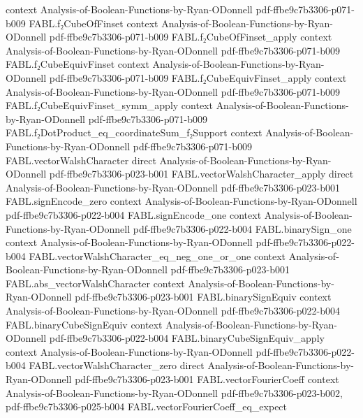 \begin{theorem}
  {context}
  {Analysis-of-Boolean-Functions-by-Ryan-ODonnell}
  {pdf-ffbe9c7b3306-p071-b009}
\proofstep
  {FABL.f₂CubeOfFinset}
  {context}
  {Analysis-of-Boolean-Functions-by-Ryan-ODonnell}
  {pdf-ffbe9c7b3306-p071-b009}
\proofstep
  {FABL.f₂CubeOfFinset_apply}
  {context}
  {Analysis-of-Boolean-Functions-by-Ryan-ODonnell}
  {pdf-ffbe9c7b3306-p071-b009}
\proofstep
  {FABL.f₂CubeEquivFinset}
  {context}
  {Analysis-of-Boolean-Functions-by-Ryan-ODonnell}
  {pdf-ffbe9c7b3306-p071-b009}
\proofstep
  {FABL.f₂CubeEquivFinset_apply}
  {context}
  {Analysis-of-Boolean-Functions-by-Ryan-ODonnell}
  {pdf-ffbe9c7b3306-p071-b009}
\proofstep
  {FABL.f₂CubeEquivFinset_symm_apply}
  {context}
  {Analysis-of-Boolean-Functions-by-Ryan-ODonnell}
  {pdf-ffbe9c7b3306-p071-b009}
\proofstep
  {FABL.f₂DotProduct_eq_coordinateSum_f₂Support}
  {context}
  {Analysis-of-Boolean-Functions-by-Ryan-ODonnell}
  {pdf-ffbe9c7b3306-p071-b009}
\proofstep
  {FABL.vectorWalshCharacter}
  {direct}
  {Analysis-of-Boolean-Functions-by-Ryan-ODonnell}
  {pdf-ffbe9c7b3306-p023-b001}
\proofstep
  {FABL.vectorWalshCharacter_apply}
  {direct}
  {Analysis-of-Boolean-Functions-by-Ryan-ODonnell}
  {pdf-ffbe9c7b3306-p023-b001}
\proofstep
  {FABL.signEncode_zero}
  {context}
  {Analysis-of-Boolean-Functions-by-Ryan-ODonnell}
  {pdf-ffbe9c7b3306-p022-b004}
\proofstep
  {FABL.signEncode_one}
  {context}
  {Analysis-of-Boolean-Functions-by-Ryan-ODonnell}
  {pdf-ffbe9c7b3306-p022-b004}
\proofstep
  {FABL.binarySign_one}
  {context}
  {Analysis-of-Boolean-Functions-by-Ryan-ODonnell}
  {pdf-ffbe9c7b3306-p022-b004}
\proofstep
  {FABL.vectorWalshCharacter_eq_neg_one_or_one}
  {context}
  {Analysis-of-Boolean-Functions-by-Ryan-ODonnell}
  {pdf-ffbe9c7b3306-p023-b001}
\proofstep
  {FABL.abs_vectorWalshCharacter}
  {context}
  {Analysis-of-Boolean-Functions-by-Ryan-ODonnell}
  {pdf-ffbe9c7b3306-p023-b001}
\proofstep
  {FABL.binarySignEquiv}
  {context}
  {Analysis-of-Boolean-Functions-by-Ryan-ODonnell}
  {pdf-ffbe9c7b3306-p022-b004}
\proofstep
  {FABL.binaryCubeSignEquiv}
  {context}
  {Analysis-of-Boolean-Functions-by-Ryan-ODonnell}
  {pdf-ffbe9c7b3306-p022-b004}
\proofstep
  {FABL.binaryCubeSignEquiv_apply}
  {context}
  {Analysis-of-Boolean-Functions-by-Ryan-ODonnell}
  {pdf-ffbe9c7b3306-p022-b004}
\proofstep
  {FABL.vectorWalshCharacter_zero}
  {direct}
  {Analysis-of-Boolean-Functions-by-Ryan-ODonnell}
  {pdf-ffbe9c7b3306-p023-b001}
\proofstep
  {FABL.vectorFourierCoeff}
  {context}
  {Analysis-of-Boolean-Functions-by-Ryan-ODonnell}
  {pdf-ffbe9c7b3306-p023-b002,
    pdf-ffbe9c7b3306-p025-b004}
\proofstep
  {FABL.vectorFourierCoeff_eq_expect}

\end{theorem}

